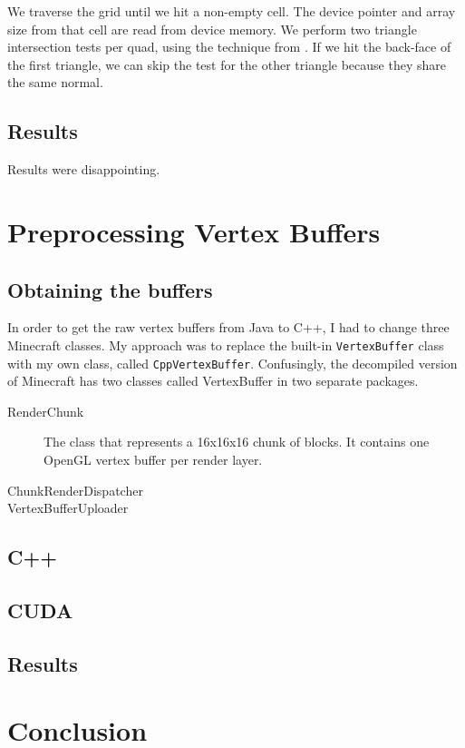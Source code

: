 \documentclass[]{article}
\begin{document}
We traverse the grid until we hit a non-empty cell.
The device pointer and array size from that cell are read from device memory.
We perform two triangle intersection tests per quad, using the technique from \cite{moller2005fast}.
If we hit the back-face of the first triangle, we can skip the test for the other triangle because they share the same normal.

\subsection{Results}
Results were disappointing.

\section{Preprocessing Vertex Buffers}

\subsection{Obtaining the buffers}
In order to get the raw vertex buffers from Java to C++, I had to change three Minecraft classes.
My approach was to replace the built-in \texttt{VertexBuffer} class with my own class, called \texttt{CppVertexBuffer}.
Confusingly, the decompiled version of Minecraft has two classes called VertexBuffer in two separate packages.


\begin{description}
  \item[RenderChunk]
    The class that represents a 16x16x16 chunk of blocks.
    It contains one OpenGL vertex buffer per render layer.
  \item[ChunkRenderDispatcher]
  \item[VertexBufferUploader]
\end{description}

\subsection{C++}

\subsection{CUDA}

\subsection{Results}

\section{Conclusion}
\end{document}
